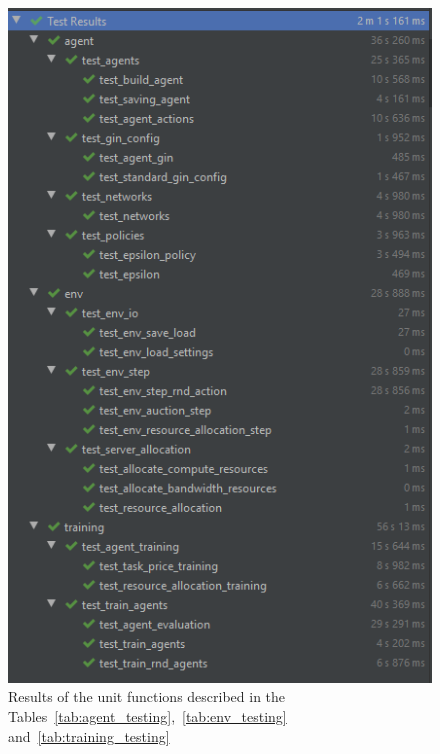 \begin{figure}[H]
    \centering
    \includegraphics{figures/4_test_eval_figs/pytest_results.PNG}
    \caption{Results of the unit functions described in the Tables~\ref{tab:agent_testing},~\ref{tab:env_testing}
        and~\ref{tab:training_testing}}
    \label{fig:pytest_results}
\end{figure}

